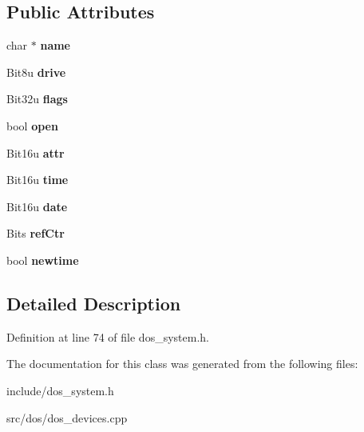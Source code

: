 \subsection*{Public Attributes}
\begin{DoxyCompactItemize}
\item 
\hypertarget{classDOS__File_a3e326c162b838b065ee83c27a112be65}{char $\ast$ {\bfseries name}}\label{classDOS__File_a3e326c162b838b065ee83c27a112be65}

\item 
\hypertarget{classDOS__File_a253253ed788a32410df6b9ecc638366f}{Bit8u {\bfseries drive}}\label{classDOS__File_a253253ed788a32410df6b9ecc638366f}

\item 
\hypertarget{classDOS__File_a2b1d061b180a8953a2e8a8ebc4021965}{Bit32u {\bfseries flags}}\label{classDOS__File_a2b1d061b180a8953a2e8a8ebc4021965}

\item 
\hypertarget{classDOS__File_a242898b780b6ca73db43631d1976caa6}{bool {\bfseries open}}\label{classDOS__File_a242898b780b6ca73db43631d1976caa6}

\item 
\hypertarget{classDOS__File_a8887614fa27d3180810eafb8c71f28fc}{Bit16u {\bfseries attr}}\label{classDOS__File_a8887614fa27d3180810eafb8c71f28fc}

\item 
\hypertarget{classDOS__File_aa15d5348eadb19dff76ce4b018504190}{Bit16u {\bfseries time}}\label{classDOS__File_aa15d5348eadb19dff76ce4b018504190}

\item 
\hypertarget{classDOS__File_aa1425a8936805dd77cfe74b353d39049}{Bit16u {\bfseries date}}\label{classDOS__File_aa1425a8936805dd77cfe74b353d39049}

\item 
\hypertarget{classDOS__File_ab3d966fce7a4b7f3b5c691a6d8a3249b}{Bits {\bfseries ref\-Ctr}}\label{classDOS__File_ab3d966fce7a4b7f3b5c691a6d8a3249b}

\item 
\hypertarget{classDOS__File_a9a1cf63a07117706b255cc89a1183d23}{bool {\bfseries newtime}}\label{classDOS__File_a9a1cf63a07117706b255cc89a1183d23}

\end{DoxyCompactItemize}


\subsection{Detailed Description}


Definition at line 74 of file dos\-\_\-system.\-h.



The documentation for this class was generated from the following files\-:\begin{DoxyCompactItemize}
\item 
include/dos\-\_\-system.\-h\item 
src/dos/dos\-\_\-devices.\-cpp\end{DoxyCompactItemize}
